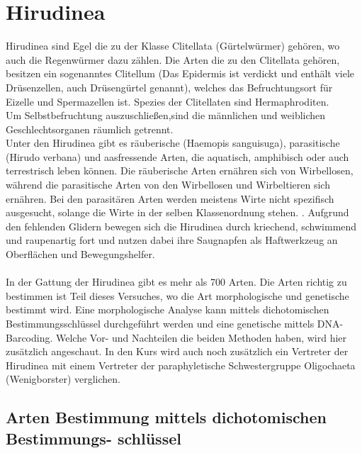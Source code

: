 \documentclass[oneside,10pt,a4paper]{report}
\begin{document}
	\chapter{Hirudinea}	
	Hirudinea sind Egel die zu der Klasse Clitellata (Gürtelwürmer) gehören, wo auch die Regenwürmer dazu zählen. Die Arten die zu den Clitellata gehören, besitzen ein sogenanntes Clitellum (Das Epidermis ist verdickt und enthält viele Drüsenzellen, auch Drüsengürtel genannt\cite{Kühkental}), welches das Befruchtungsort für Eizelle und Spermazellen ist. Spezies der Clitellaten sind Hermaphroditen. \\
	Um Selbstbefruchtung auszuschließen,sind die männlichen und weiblichen Geschlechtsorganen räumlich getrennt.\\
	Unter den Hirudinea gibt es räuberische (Haemopis sanguisuga), parasitische (Hirudo verbana) und aasfressende Arten, die aquatisch, amphibisch oder auch terrestrisch leben können.
	Die räuberische Arten ernähren sich von Wirbellosen, während die parasitische Arten von den Wirbellosen und Wirbeltieren sich ernähren. Bei den parasitären Arten werden meistens Wirte nicht spezifisch ausgesucht, solange die Wirte in der selben Klassenordnung stehen. \cite{Kühkental}.
	Aufgrund den fehlenden Glidern bewegen sich die Hirudinea durch kriechend, schwimmend und raupenartig fort und nutzen dabei ihre Saugnapfen als Haftwerkzeug an Oberflächen und Bewegungshelfer.\\
	\\
	In der Gattung der Hirudinea gibt es mehr als 700 Arten. Die Arten richtig zu bestimmen ist Teil dieses Versuches, wo die Art morphologische und genetische bestimmt wird. Eine morphologische Analyse kann mittels dichotomischen Bestimmungsschlüssel durchgeführt werden und eine genetische mittels DNA-Barcoding. Welche Vor- und Nachteilen die beiden Methoden haben, wird hier zusätzlich angeschaut.
	In den Kurs wird auch noch zusätzlich ein Vertreter der Hirudinea mit einem Vertreter der paraphyletische Schwestergruppe Oligochaeta (Wenigborster) verglichen.
	
	
		\section{Arten Bestimmung mittels dichotomischen Bestimmungs- schlüssel}\label{Abschnitt: DichoBestim}
\end{document}
